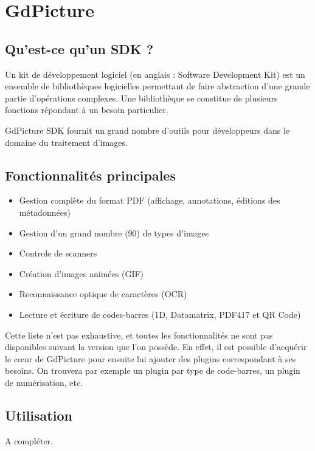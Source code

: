 \chapter{GdPicture}
\label{gdpicture}

\section{Qu'est-ce qu'un SDK ?}

Un kit de développement logiciel (en anglais : Software Development Kit) est un ensemble de bibliothèques logicielles permettant de faire abstraction d'une grande partie d'opérations complexes. Une bibliothèque se constitue de plusieurs fonctions répondant à un besoin particulier.

GdPicture SDK fournit un grand nombre d'outils pour développeurs dans le domaine du traitement d'images.

\section{Fonctionnalités principales}

\begin{itemize}
\item Gestion complète du format PDF (affichage, annotations, éditions des métadonnées)
\item Gestion d'un grand nombre (90) de types d'images
\item Controle de scanners
\item Création d'images animées (GIF)
\item Reconnaissance optique de caractères (OCR)
\item Lecture et écriture de codes-barres (1D, Datamatrix, PDF417 et QR Code)
\end{itemize}

Cette liste n'est pas exhaustive, et toutes les fonctionnalités ne sont pas disponibles suivant la version que l'on possède. En effet, il est possible d'acquérir le c\oe ur de GdPicture pour ensuite lui ajouter des plugins correspondant à ses besoins. On trouvera  par exemple un plugin par type de code-barres, un plugin de numérisation, etc.

\section{Utilisation}

A compléter.